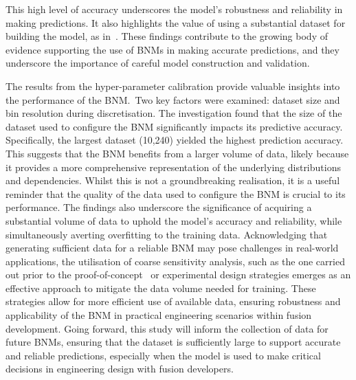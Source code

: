 \documentclass[journal]{IEEEtran}
\begin{document}
This high level of accuracy underscores the model's robustness and reliability in making predictions. It also highlights the value of using a substantial dataset for building the model, as in~\cite{Griffiths2024}. These findings contribute to the growing body of evidence supporting the use of BNMs in making accurate predictions, and they underscore the importance of careful model construction and validation.

The results from the hyper-parameter calibration provide valuable insights into the performance of the BNM.~Two key factors were examined: dataset size and bin resolution during discretisation. The investigation found that the size of the dataset used to configure the BNM significantly impacts its predictive accuracy. Specifically, the largest dataset (10,240) yielded the highest prediction accuracy. This suggests that the BNM benefits from a larger volume of data, likely because it provides a more comprehensive representation of the underlying distributions and dependencies. Whilst this is not a groundbreaking realisation, it is a useful reminder that the quality of the data used to configure the BNM is crucial to its performance. The findings also underscore the significance of acquiring a substantial volume of data to uphold the model's accuracy and reliability, while simultaneously averting overfitting to the training data. Acknowledging that generating sufficient data for a reliable BNM may pose challenges in real-world applications, the utilisation of coarse sensitivity analysis, such as the one carried out prior to the proof-of-concept~\cite{Griffiths2024,Hidalgo-Salaverri2023} or experimental design strategies emerges as an effective approach to mitigate the data volume needed for training. These strategies allow for more efficient use of available data, ensuring robustness and applicability of the BNM in practical engineering scenarios within fusion development. Going forward, this study will inform the collection of data for future BNMs, ensuring that the dataset is sufficiently large to support accurate and reliable predictions, especially when the model is used to make critical decisions in engineering design with fusion developers.
\end{document}

